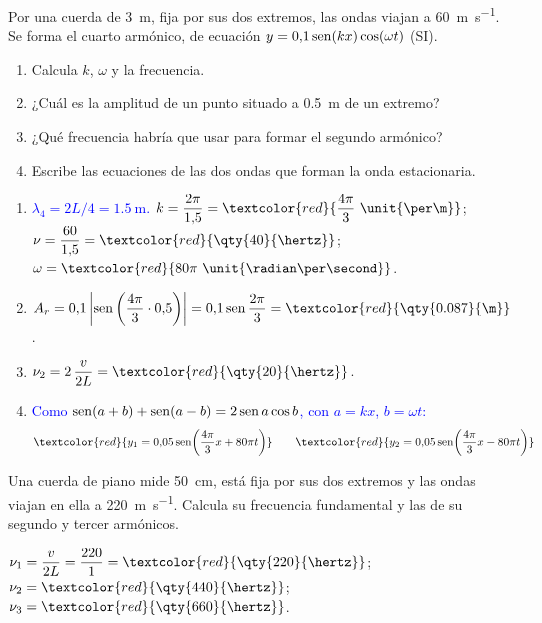 \begin{exercise}
    Por una cuerda de \qty{3}{\m}, fija por sus dos extremos, las ondas viajan a \qty{60}{\m\per\second}. Se forma el cuarto
    armónico, de ecuación \(y = 0{,}1\operatorname{sen}(kx)\cos(\omega t)\) (SI).
    \begin{enumerate}[label=\letraminuscula]
        \item Calcula \(k\), \(\omega\) y la frecuencia.
        \item ¿Cuál es la amplitud de un punto situado a \qty{0.5}{\m} de un extremo?
        \item ¿Qué frecuencia habría que usar para formar el segundo armónico?
        \item Escribe las ecuaciones de las dos ondas que forman la onda estacionaria.
    \end{enumerate}
    \begin{solu}
        \begin{enumerate}[label=\letraminuscula]
            \item \textcolor{blue}{\(\lambda_4 = 2L/4 = \qty{1.5}{\m}\).} \(k = \dfrac{2\pi}{1{,}5} = \textcolor{red}{\dfrac{4\pi}{3}\ \unit{\per\m}}\);
            \(\nu = \dfrac{60}{1{,}5} = \textcolor{red}{\qty{40}{\hertz}}\); \(\omega = \textcolor{red}{80\pi\ \unit{\radian\per\second}}\).
            \item \(A_r = 0{,}1\left|\sen\left(\dfrac{4\pi}{3}\cdot 0{,}5\right)\right| = 0{,}1\sen\dfrac{2\pi}{3} = \textcolor{red}{\qty{0.087}{\m}}\).
            \item \(\nu_2 = 2\,\dfrac{v}{2L} = \textcolor{red}{\qty{20}{\hertz}}\).
            \item \textcolor{blue}{Como \(\operatorname{sen}(a + b) + \operatorname{sen}(a - b) = 2\operatorname{sen} a\cos b\), con \(a = kx\), \(b = \omega t\):}
            \[ \textcolor{red}{y_1 = 0{,}05\sen\!\left(\dfrac{4\pi}{3}x + 80\pi t\right)} \qquad \textcolor{red}{y_2 = 0{,}05\sen\!\left(\dfrac{4\pi}{3}x - 80\pi t\right)} \]
        \end{enumerate}
    \end{solu}
\end{exercise}

\begin{exercise}
    Una cuerda de piano mide \qty{50}{\cm}, está fija por sus dos extremos y las ondas viajan en ella a \qty{220}{\m\per\second}.
    Calcula su frecuencia fundamental y las de su segundo y tercer armónicos.
    \begin{solu}
        \(\nu_1 = \dfrac{v}{2L} = \dfrac{220}{1} = \textcolor{red}{\qty{220}{\hertz}}\); \(\nu_2 = \textcolor{red}{\qty{440}{\hertz}}\); \(\nu_3 = \textcolor{red}{\qty{660}{\hertz}}\).
    \end{solu}
\end{exercise}

